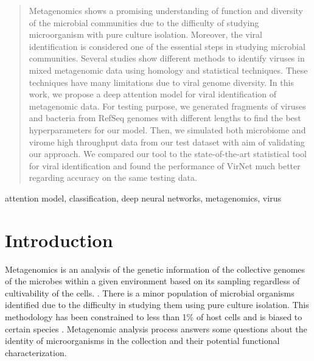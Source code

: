 \documentclass[conference]{IEEEtran}
\begin{document}
\begin{abstract}Metagenomics shows a promising understanding of function and diversity of the microbial communities due to the difficulty of studying microorganism with pure culture isolation. Moreover, the viral identification is considered one of the essential steps in studying microbial communities. Several studies show different methods to identify viruses in mixed metagenomic data %
using homology and statistical techniques. These techniques have many limitations due to viral genome diversity. In this work, we propose a deep attention model for viral identification of metagenomic data. For testing purpose, we generated fragments of viruses and bacteria from RefSeq genomes with different lengths to find the best hyperparameters for our model. Then, we simulated both microbiome and virome high throughput data from our test dataset with aim of validating our approach. 
We compared our tool to the state-of-the-art statistical tool for viral identification and found the performance of VirNet much better regarding accuracy on the same testing data. 

\end{abstract}
\begin{IEEEkeywords}
	attention model, classification, deep neural networks, metagenomics, virus
\end{IEEEkeywords}


\section{Introduction}

Metagenomics is an analysis of the genetic information of the collective genomes of the microbes within a given environment based on its sampling regardless of cultivability of the cells. \cite{izard2014metagenomics}. There is a minor population of microbial organisms identified due to the difficulty in studying them using pure culture isolation. This methodology has been constrained to less than 1\% of host cells and is biased to certain species \cite{labonte2015single}.
Metagenomic analysis process %
answers some questions about the identity of microorganisms in the collection and their potential functional characterization.
\end{document}
